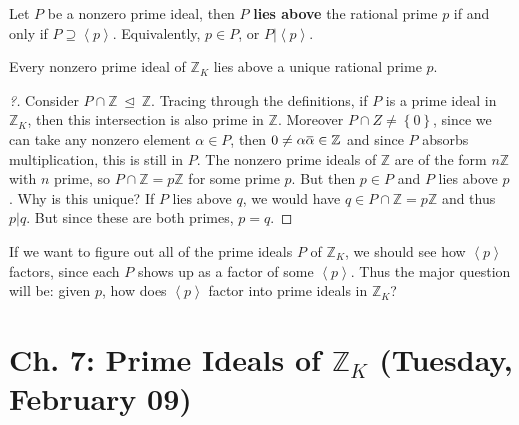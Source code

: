 \begin{definition}

Let \(P\) be a nonzero prime ideal, then \(P\) \textbf{lies above} the
rational prime \(p\) if and only if
\(P \supseteq \left\langle{ p }\right\rangle\). Equivalently,
\(p\in P\), or \(P\mathrel{\Big|}\left\langle{ p }\right\rangle\).

\end{definition}

\begin{theorem}[?]

Every nonzero prime ideal of \({\mathbb{Z}}_K\) lies above a unique
rational prime \(p\).

\end{theorem}

\begin{proof}[?]

Consider \(P \cap{\mathbb{Z}}{~\trianglelefteq~}{\mathbb{Z}}\). Tracing
through the definitions, if \(P\) is a prime ideal in
\({\mathbb{Z}}_K\), then this intersection is also prime in
\({\mathbb{Z}}\). Moreover \(P \cap Z \neq \left\{{ 0 }\right\}\), since
we can take any nonzero element \(\alpha \in P\), then
\(0\neq \alpha\mkern 1.5mu\overline{\mkern-1.5mu\alpha \mkern-1.5mu}\mkern 1.5mu\in {\mathbb{Z}}\)
and since \(P\) absorbs multiplication, this is still in \(P\). The
nonzero prime ideals of \({\mathbb{Z}}\) are of the form
\(n{\mathbb{Z}}\) with \(n\) prime, so
\(P \cap{\mathbb{Z}}= p{\mathbb{Z}}\) for some prime \(p\). But then
\(p\in P\) and \(P\) lies above \(p\). Why is this unique? If \(P\) lies
above \(q\), we would have \(q\in P \cap{\mathbb{Z}}= p {\mathbb{Z}}\)
and thus \(p\mathrel{\Big|}q\). But since these are both primes,
\(p=q\).

\end{proof}

\begin{remark}

If we want to figure out all of the prime ideals \(P\) of
\({\mathbb{Z}}_K\), we should see how \(\left\langle{ p }\right\rangle\)
factors, since each \(P\) shows up as a factor of some
\(\left\langle{ p }\right\rangle\). Thus the major question will be:
given \(p\), how does \(\left\langle{ p }\right\rangle\) factor into
prime ideals in \({\mathbb{Z}}_K\)?

\end{remark}

\hypertarget{ch.-7-prime-ideals-of-mathbbz_k-tuesday-february-09}{%
\section{\texorpdfstring{Ch. 7: Prime Ideals of \({\mathbb{Z}}_K\)
(Tuesday, February
09)}{Ch. 7: Prime Ideals of \{\textbackslash mathbb\{Z\}\}\_K (Tuesday, February 09)}}\label{ch.-7-prime-ideals-of-mathbbz_k-tuesday-february-09}}

